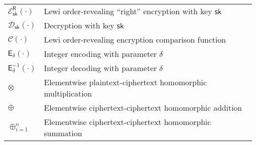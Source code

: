 \documentclass[oneside]{scrbook}
\theoremstyle{definition}
\theoremstyle{definition}
\theoremstyle{remark}
\begin{document}
\begin{longtable}{p{}p{}}
    $\mathcal{E}^{\mathsf{R}}_{\mathsf{sk}}(\cdot)$ & Lewi order-revealing ``right'' encryption with key $\mathsf{sk}$\\
    $\mathcal{D}_{\mathsf{sk}}(\cdot)$ & Decryption with key $\mathsf{sk}$\\
    $\mathcal{C}(\cdot)$ & Lewi order-revealing encryption comparison function\\
    $\mathsf{E}_{\delta}(\cdot)$ & Integer encoding with parameter $\delta$\\
    $\mathsf{E}_{\delta}^{-1}(\cdot)$ & Integer decoding with parameter $\delta$\\
    $\otimes$ & Elementwise plaintext-ciphertext homomorphic multiplication\\
    $\oplus$ & Elementwise ciphertext-ciphertext homomorphic addition\\
    $\oplus_{i=1}^n$ & Elementwise ciphertext-ciphertext homomorphic summation\\
\end{longtable}
\end{document}
